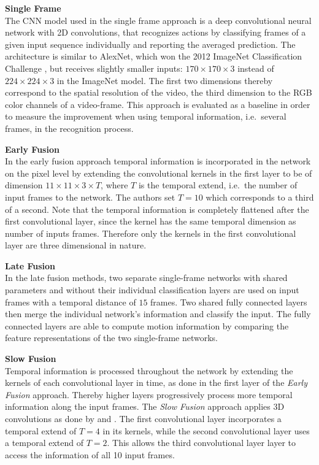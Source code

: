 \textbf{Single Frame}\\
The CNN model used in the single frame approach is a deep convolutional neural network with 2D convolutions, that recognizes actions by classifying frames of a given input sequence individually and reporting the averaged prediction.
The architecture is similar to AlexNet, which won the 2012 ImageNet Classification Challenge \cite{krizhevsky_imagenet_2012-1}, but receives slightly smaller inputs: $170\times170\times3$ instead of $224\times224\times3$ in the ImageNet model.
The first two dimensions thereby correspond to the spatial resolution of the video, the third dimension to the RGB color channels of a video-frame.
This approach is evaluated as a baseline in order to measure the improvement when using temporal information, i.e.\ several frames, in the recognition process. 

\textbf{Early Fusion}\\
In the early fusion approach temporal information is incorporated in the network on the pixel level by extending the convolutional kernels in the first layer to be of dimension $11 \times 11 \times 3 \times T$, where $T$ is the temporal extend, i.e.\ the number of input frames to the network.
The authors set $T = 10$ which corresponds to a third of a second.
Note that the temporal information is completely flattened after the first convolutional layer, since the kernel has the same temporal dimension as number of inputs frames.
Therefore only the kernels in the first convolutional layer are three dimensional in nature.

\textbf{Late Fusion}\\
In the late fusion methods, two separate single-frame networks with shared parameters and without their individual classification layers are used on input frames with a temporal distance of $15$ frames.
Two shared fully connected layers then merge the individual network's information and classify the input. 
The fully connected layers are able to compute motion information by comparing the feature representations of the two single-frame networks.

\textbf{Slow Fusion}\\
Temporal information is processed throughout the network by extending the kernels of each convolutional layer in time, as done in the first layer of the \textit{Early Fusion} approach.
Thereby higher layers progressively process more temporal information along the input frames.
The \textit{Slow Fusion} approach applies 3D convolutions as done by \textcite{ji_3d_2013} and \textcite{baccouche_sequential_2011}.
The first convolutional layer incorporates a temporal extend of $T = 4$ in its kernels, while the second convolutional layer uses a temporal extend of $T = 2$.
This allows the third convolutional layer layer to access the information of all 10 input frames.

